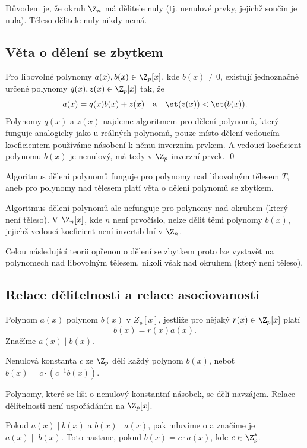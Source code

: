 Důvodem je, že okruh $\Z_n$ má dělitele nuly (tj. nenulové prvky, jejichž součin je nula). Těleso dělitele nuly nikdy nemá.

\subsection{Věta o dělení se zbytkem}
Pro libovolné polynomy $a(x), b(x) \in \Z_p[x]$, kde $b(x) \not= 0$, existují jednoznačně určené polynomy $q(x), z(x) \in \Z_p[x]$ tak, že
\begin{equation}
	a(x) = q(x) b(x) + z(x) \quad \text{a} \quad \st(z(x)) < \st(b(x)).
\end{equation}
\dukaz Polynomy $q(x)$ a $z(x)$ najdeme algoritmem pro dělení polynomů, který funguje analogicky jako u reálných polynomů, pouze místo dělení vedoucím koeficientem používáme násobení k němu inverzním prvkem. A vedoucí koeficient polynomu $b(x)$ je nenulový, má tedy v $\Z_p$ inverzní prvek.
\hspace{\fill}\qed

Algoritmus dělení polynomů funguje pro polynomy nad libovolným tělesem $T$, aneb pro polynomy nad tělesem platí věta o dělení polynomů se zbytkem.

Algoritmus dělení polynomů ale nefunguje pro polynomy nad okruhem (který není těleso). V $\Z_n[x]$, kde $n$ není prvočíslo, nelze dělit těmi polynomy $b(x)$, jejichž vedoucí koeficient není invertibilní v $\Z_n$.

Celou následující teorii opřenou o dělení se zbytkem proto lze vystavět na polynomech nad libovolným tělesem, nikoli však nad okruhem (který není těleso).

\subsection{Relace dělitelnosti a relace asociovanosti}
Polynom $a(x)$  polynom $b(x)$ v $Z_p[x]$, jestliže pro nějaký $r(x) \in \Z_p[x]$ platí
\begin{equation}
	b(x) = r(x) a(x).
\end{equation}
Značíme $a(x) \mid b(x)$.

Nenulová konstanta $c$ ze $\Z_p$ dělí každý polynom $b(x)$, neboť $b(x) = c \cdot (c^{-1}b(x))$.

Polynomy, které se liši o nenulový konstantní násobek, se dělí navzájem. Relace dělitelnosti není uspořádáním na $\Z_p[x]$.

Pokud $a(x) \mid b(x)$ a $b(x) \mid a(x)$, pak mluvíme o  a značíme je $a(x) \mid \mid b(x)$. Toto nastane, pokud $b(x) = c \cdot a(x)$, kde $c \in \Z_p^*$. 

